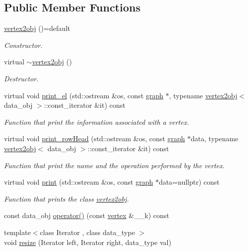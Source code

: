 \subsection*{Public Member Functions}
\begin{DoxyCompactItemize}
\item 
\hyperlink{structvertex2obj_a8ffbfccc140ddc7341419229a65d5a21}{vertex2obj} ()=default
\begin{DoxyCompactList}\small\item\em Constructor. \end{DoxyCompactList}\item 
virtual \hyperlink{structvertex2obj_a47020e1346f41dbcec36d0c534c37747}{$\sim$vertex2obj} ()
\begin{DoxyCompactList}\small\item\em Destructor. \end{DoxyCompactList}\item 
virtual void \hyperlink{structvertex2obj_a2cfa844f7671d7b698495e6078879d9b}{print\+\_\+el} (std\+::ostream \&os, const \hyperlink{structgraph}{graph} $\ast$, typename \hyperlink{structvertex2obj}{vertex2obj}$<$ data\+\_\+obj $>$\+::const\+\_\+iterator \&it) const
\begin{DoxyCompactList}\small\item\em Function that print the information associated with a vertex. \end{DoxyCompactList}\item 
virtual void \hyperlink{structvertex2obj_aa339d6dd020c8d0166311a129a9182b5}{print\+\_\+row\+Head} (std\+::ostream \&os, const \hyperlink{structgraph}{graph} $\ast$data, typename \hyperlink{structvertex2obj}{vertex2obj}$<$ data\+\_\+obj $>$\+::const\+\_\+iterator \&it) const
\begin{DoxyCompactList}\small\item\em Function that print the name and the operation performed by the vertex. \end{DoxyCompactList}\item 
virtual void \hyperlink{structvertex2obj_a650c769f8be6474398b43a30ba5ef8ee}{print} (std\+::ostream \&os, const \hyperlink{structgraph}{graph} $\ast$data=nullptr) const
\begin{DoxyCompactList}\small\item\em Function that prints the class \hyperlink{structvertex2obj}{vertex2obj}. \end{DoxyCompactList}\item 
const data\+\_\+obj \hyperlink{structvertex2obj_a3a10959d65d03b1c6b81b859e48426dd}{operator()} (const \hyperlink{graph_8hpp_abefdcf0544e601805af44eca032cca14}{vertex} \&\+\_\+\+\_\+k) const
\item 
{\footnotesize template$<$class Iterator , class data\+\_\+type $>$ }\\void \hyperlink{structvertex2obj_aab30f1c6b751f7679864447ce2f795e2}{resize} (Iterator left, Iterator right, data\+\_\+type val)
\end{DoxyCompactItemize}
